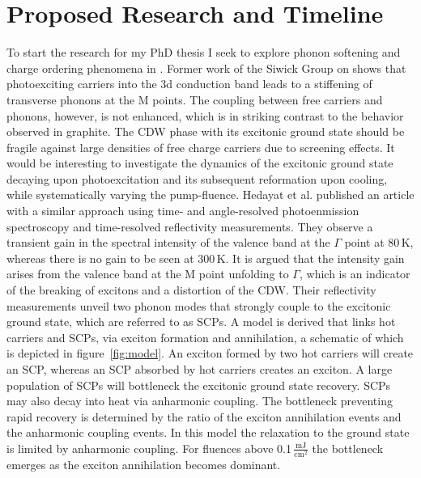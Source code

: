 \section{Proposed Research and Timeline}
To start the research for my PhD thesis I seek to explore phonon softening and charge ordering phenomena in \ts.
Former work of the Siwick Group on \ts\space shows that photoexciting carriers into the 3d conduction band leads to a stiffening of transverse phonons at the M points\cite{otto2021}.
The coupling between free carriers and phonons, however, is not enhanced, which is in striking contrast to the behavior observed in graphite\cite{stern2018}.
The \ac{CDW} phase with its excitonic ground state should be fragile against large densities of free charge carriers due to screening effects.
It would be interesting to investigate the dynamics of the excitonic ground state decaying upon photoexcitation and its subsequent reformation upon cooling, while systematically varying the pump-fluence.
Hedayat et al. published an article with a similar approach using time- and angle-resolved photoenmission spectroscopy and time-resolved reflectivity measurements\cite{hedayat2019}.
They observe a transient gain in the spectral intensity of the valence band at the $\Gamma$ point at 80\,K, whereas there is no gain to be seen at 300\,K.
It is argued that the intensity gain arises from the valence band at the M point unfolding to $\Gamma$, which is an indicator of the breaking of excitons and a distortion of the \ac{CDW}.
Their reflectivity measurements unveil two phonon modes that strongly couple to the excitonic ground state, which are referred to as \acp{SCP}.
A model is derived that links hot carriers and \acp{SCP}, via exciton formation and annihilation, a schematic of which is depicted in figure~\ref{fig:model}.
An exciton formed by two hot carriers will create an \ac{SCP}, whereas an \ac{SCP} absorbed by hot carriers creates an exciton.
A large population of \acp{SCP} will bottleneck the excitonic ground state recovery.
\Acp{SCP} may also decay into heat via anharmonic coupling.
The bottleneck preventing rapid recovery is determined by the ratio of the exciton annihilation events and the anharmonic coupling events.
In this model the relaxation to the ground state is limited by anharmonic coupling.
For fluences above 0.1\,$\frac{\mathrm{mJ}}{\mathrm{cm^2}}$ the bottleneck emerges as the exciton annihilation becomes dominant.

